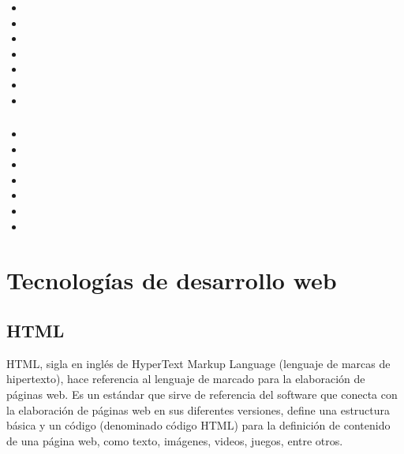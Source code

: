 \begin{itemize}

	\item
	
	\item
	
	\item
	
	\item
	
	\item
	
	\item
	
	\item
	
\end{itemize}

\subsubsection{}

\begin{itemize}

	\item
	
	\item
	
	\item
	
	\item
	
	\item
	
	\item
	
	\item
	
\end{itemize}


\section{Tecnologías de desarrollo web}

\subsection{HTML}

HTML, sigla en inglés de HyperText Markup Language (lenguaje de marcas de hipertexto), hace referencia al lenguaje de marcado para la elaboración de páginas web. Es un estándar que sirve de referencia del software que conecta con la elaboración de páginas web en sus diferentes versiones, define una estructura básica y un código (denominado código HTML) para la definición de contenido de una página web, como texto, imágenes, videos, juegos, entre otros. 


